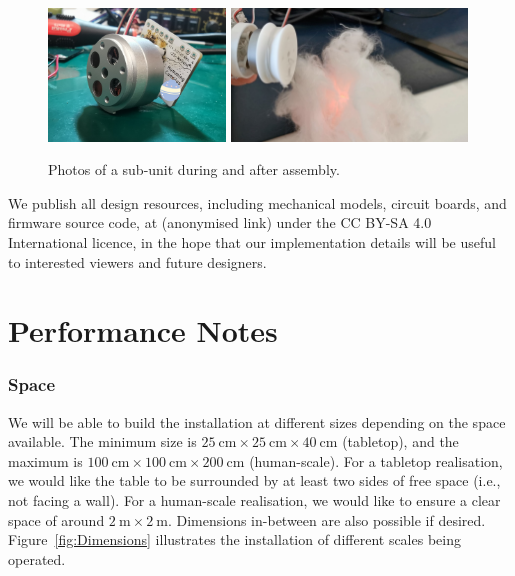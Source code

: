 \documentclass{nimemusic}
\begin{document}
\begin{figure}[h!]
  \includegraphics[width=0.42\textwidth]{Motor.jpg}
  \includegraphics[width=0.56\textwidth]{Cloud.jpg}
  \caption{Photos of a sub-unit during and after assembly.}
  \label{fig:Sub-unit}
\end{figure}

We publish all design resources, including mechanical models, circuit boards, and firmware source code, at (anonymised link) under the CC BY-SA 4.0 International licence, in the hope that our implementation details will be useful to interested viewers and future designers.

\section{Performance Notes}
\label{sect:Perf_Notes}

\subsubsection{Space}
We will be able to build the installation at different sizes depending on the space available. The minimum size is $25\ \text{cm} \times 25\ \text{cm} \times 40\ \text{cm}$ (tabletop), and the maximum is $100\ \text{cm} \times 100\ \text{cm} \times 200\ \text{cm}$ (human-scale). For a tabletop realisation, we would like the table to be surrounded by at least two sides of free space (i.e., not facing a wall). For a human-scale realisation, we would like to ensure a clear space of around $2\ \text{m} \times 2\ \text{m}$. Dimensions in-between are also possible if desired. Figure~\ref{fig:Dimensions} illustrates the installation of different scales being operated.
\end{document}
